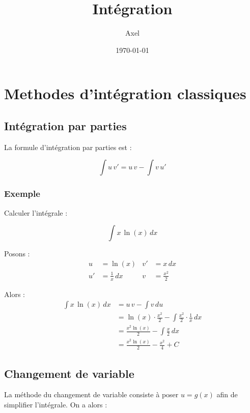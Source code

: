 \documentclass{article}
\title{Intégration}
\author{Axel}
\date{\today}
\begin{document}
\maketitle

\section*{Methodes d'intégration classiques}


\subsection*{Intégration par parties}

La formule d'intégration par parties est :

\begin{equation}
    \int u \, v' = u \, v - \int v \, u'
\end{equation}

\subsubsection*{Exemple}

Calculer l'intégrale :

\begin{equation}
    \int x \, \ln(x) \, dx
\end{equation}

Posons :
\begin{align*}
    u &= \ln(x) & v' &= x \, dx \\
    u' &= \frac{1}{x} \, dx & v &= \frac{x^2}{2}
\end{align*}

Alors :
\begin{align*}
    \int x \, \ln(x) \, dx &= u \, v - \int v \, du \\
    &= \ln(x) \cdot \frac{x^2}{2} - \int \frac{x^2}{2} \cdot \frac{1}{x} \, dx \\
    &= \frac{x^2 \ln(x)}{2} - \int \frac{x}{2} \, dx \\
    &= \frac{x^2 \ln(x)}{2} - \frac{x^2}{4} + C
\end{align*}

\subsection*{Changement de variable}

La méthode du changement de variable consiste à poser $u = g(x)$ afin de simplifier l'intégrale. On a alors :
\end{document}
